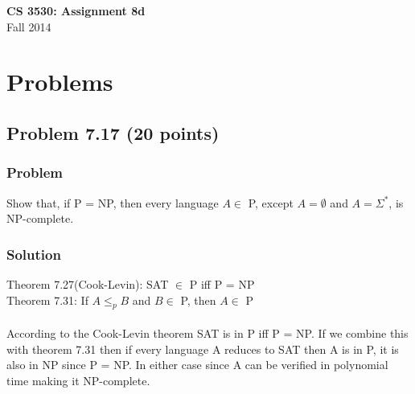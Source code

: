 \documentclass{article}
\begin{document}
\begin{center}
\textbf{\Large CS 3530: Assignment 8d} \\[2mm]
Fall 2014
\end{center}

\raggedright

\section*{Problems}

\subsection*{Problem 7.17 (20 points)}

\subsubsection*{Problem}

Show that, if P = NP, then every language $A\in$ P, except
$A=\emptyset$ and $A=\Sigma^*$, is NP-complete.

\subsubsection*{Solution}

Theorem 7.27(Cook-Levin):  SAT $\in$ P iff P = NP \\
Theorem 7.31: If $A \le_p B$ and $B \in$ P, then $A \in$ P \\ \ \\

According to the Cook-Levin theorem SAT is in P iff P = NP.
If we combine this with theorem 7.31 then if every language
A reduces to SAT then A is in P, it is also in NP since P = NP.
In either case since A can be verified in polynomial time
making it NP-complete. \\ 
\end{document}
